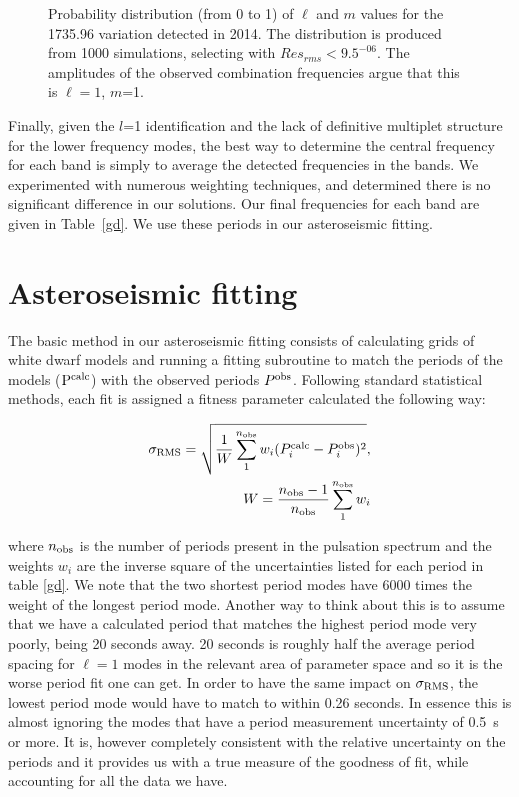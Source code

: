 \documentclass[12pt,preprint]{aastex}
\begin{document}
\begin{figure}
 \caption{Probability distribution (from 0 to 1) of $\ell$ and $m$ values for the 1735.96 variation detected in 
 2014.  The distribution is produced from 1000 simulations, selecting with $Res_{rms}<9.5^{-06}$. 
 The amplitudes of the observed combination frequencies argue that this is $\ell=1$, $m$=1.  
 \label{modeamps}
 }
\end{figure}


Finally, given the $l$=1 identification and the lack of definitive multiplet structure for the lower 
frequency modes, the best way to determine the central frequency for each band is simply to 
average the detected frequencies in the bands.  We experimented with numerous weighting techniques, 
and determined there is no significant difference in our solutions.  Our final frequencies for each band 
are given in Table~\ref{gd}. We use these periods in our asteroseismic fitting. 

\section{Asteroseismic fitting}
\label{fitting}

The basic method in our asteroseismic fitting consists of calculating grids of white dwarf models and 
running a fitting subroutine to match the periods of the models ($\rm P^{calc}$) with the observed 
periods $P^{\rm obs}$. Following standard statistical methods, each fit is assigned a fitness 
parameter calculated the following way:

\begin{eqnarray}
\label{fiteq1}
\sigma_{\rm RMS} = \sqrt{\frac{1}{W} \sum_{1}^{n_{\rm obs}} {w_i(P^{\rm calc}_i-P^{\rm obs}_i)^2}}, \\
W=\frac{n_{\rm obs}-1}{n_{\rm obs}}\sum_{1}^{n_{\rm obs}}w_i
\end{eqnarray}

\noindent where $n_{\rm obs}$ is the number of periods present in the pulsation spectrum and the weights $w_i$ 
are the inverse square of the uncertainties listed for each period in table \ref{gd}. We note that the two 
shortest period modes have 6000 times the weight of the longest period mode. Another way to think about this 
is to assume that we have a calculated period that matches the highest period mode very poorly, 
being 20 seconds away. 20 seconds is roughly half the average period spacing for $\ell=1$ modes in the 
relevant area of parameter space and so it is the worse period fit one can get. In order to have the 
same impact on $\sigma_{\rm RMS}$, the lowest period mode would have to match to within 0.26 seconds. 
In essence this is almost ignoring the modes that have a period measurement uncertainty of 0.5~s or more. 
It is, however completely consistent with the relative uncertainty on the periods and it provides us with 
a true measure of the goodness of fit, while accounting for all the data we have.
\end{document}
